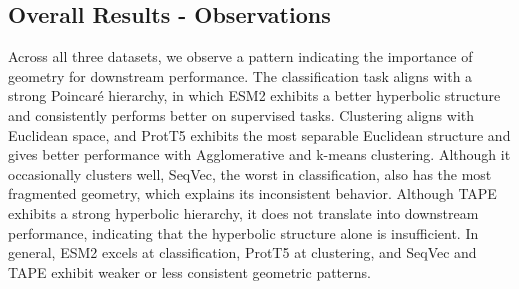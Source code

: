 \documentclass[]{Liebert_Author_revised}
\begin{document}

\subsection{Overall Results - Observations}
Across all three datasets, we observe a pattern indicating the importance of geometry for downstream performance. The classification task aligns with a strong Poincaré hierarchy, in which ESM2 exhibits a better hyperbolic structure and consistently performs better on supervised tasks. Clustering aligns with Euclidean space, and ProtT5 exhibits the most separable Euclidean structure and gives better performance with Agglomerative and k-means clustering. Although it occasionally clusters well, SeqVec, the worst in classification, also has the most fragmented geometry, which explains its inconsistent behavior. Although TAPE exhibits a strong hyperbolic hierarchy, it does not translate into downstream performance, indicating that the hyperbolic structure alone is insufficient. In general, ESM2 excels at classification, ProtT5 at clustering, and SeqVec and TAPE exhibit weaker or less consistent geometric patterns.

\end{document}
